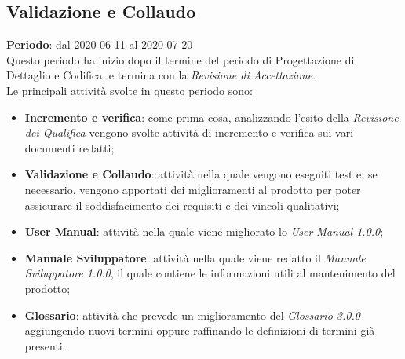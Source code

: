 \subsection{Validazione e Collaudo}
\textbf{Periodo}: dal 2020-06-11 al 2020-07-20 \\
Questo periodo ha inizio dopo il termine del periodo di Progettazione di Dettaglio e Codifica, e termina con la \textit{Revisione di Accettazione}. \\
Le principali attività svolte in questo periodo sono:
\begin{itemize}
	\item \textbf{Incremento e verifica}: come prima cosa, analizzando l'esito della \textit{Revisione dei Qualifica} vengono svolte attività di incremento e verifica sui vari documenti redatti;
	\item \textbf{Validazione e Collaudo}: attività nella quale vengono eseguiti test e, se necessario, vengono apportati dei miglioramenti al prodotto per poter assicurare il soddisfacimento dei requisiti e dei vincoli qualitativi;
	\item \textbf{User Manual}: attività nella quale viene migliorato lo \textit{User Manual 1.0.0};
	\item \textbf{Manuale Sviluppatore}: attività nella quale viene redatto il \textit{Manuale Sviluppatore 1.0.0}, il quale contiene le informazioni utili al mantenimento del prodotto;
	\item \textbf{Glossario}: attività che prevede un miglioramento del \textit{Glossario 3.0.0} aggiungendo nuovi termini oppure raffinando le definizioni di termini già presenti.
\end{itemize}
